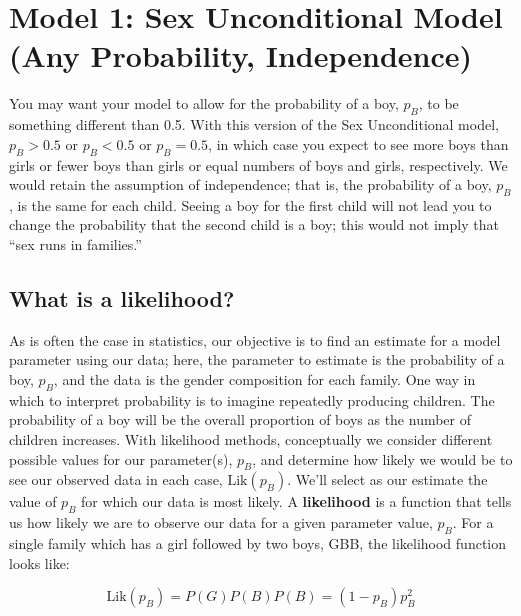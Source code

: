 \documentclass[
]{krantz}
\newcommand{\lik}{\mathrm{Lik}}
\begin{document}
\hypertarget{sex_unconditional_model}{%
\section{Model 1: Sex Unconditional Model (Any Probability, Independence)}\label{sex_unconditional_model}}

You may want your model to allow for the probability of a boy, \(p_B\), to be something different than 0.5. With this version of the Sex Unconditional model, \(p_B>0.5\) or \(p_B<0.5\) or \(p_B=0.5\), in which case you expect to see more boys than girls or fewer boys than girls or equal numbers of boys and girls, respectively. We would retain the assumption of independence; that is, the probability of a boy, \(p_B\), is the same for each child. Seeing a boy for the first child will not lead you to change the probability that the second child is a boy; this would not imply that ``sex runs in families.''

\hypertarget{what-is-a-likelihood}{%
\subsection{What is a likelihood?}\label{what-is-a-likelihood}}

As is often the case in statistics, our objective is to find an estimate for a model parameter using our data; here, the parameter to estimate is the probability of a boy, \(p_B\), and the data is the gender composition for each family. One way in which to interpret probability is to imagine repeatedly producing children. The probability of a boy will be the overall proportion of boys as the number of children increases.
With likelihood methods, conceptually we consider different possible values for our parameter(s), \(p_B\), and determine how likely we would be to see our observed data in each case, \(\lik(p_B)\). We'll select as our estimate the value of \(p_B\) for which our data is most likely. A \textbf{likelihood}  is a function that tells us how likely we are to observe our data for a given parameter value, \(p_B\). For a single family which has a girl followed by two boys, GBB, the likelihood function looks like:

\begin{equation*}
 \lik (p_B) = P(G)P(B)P(B) = (1-p_B)p_B^2
\end{equation*}
\end{document}
